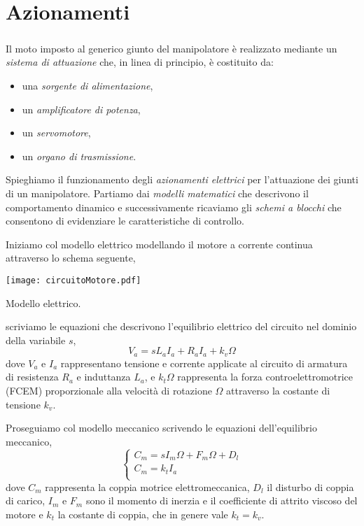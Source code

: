 \chapter{Azionamenti}
\paragraph{}
Il moto imposto al generico giunto del manipolatore è realizzato mediante un \emph{sistema di attuazione} che, in linea di principio, è costituito da:
\begin{itemize}
	\item una \emph{sorgente di alimentazione},
	\item un \emph{amplificatore di potenza},
	\item un \emph{servomotore},
	\item un \emph{organo di trasmissione}. 
\end{itemize}

Spieghiamo il funzionamento degli \emph{azionamenti elettrici} per l'attuazione dei giunti di un manipolatore. Partiamo dai \emph{modelli matematici} che descrivono il comportamento dinamico e successivamente ricaviamo gli \emph{schemi a blocchi} che consentono di evidenziare le caratteristiche di controllo.

Iniziamo col modello elettrico modellando il motore a corrente continua attraverso lo schema seguente,
\begin{center}
	\texttt{[image: circuitoMotore.pdf]}
	\caption{Modello elettrico.}
\end{center}

scriviamo le equazioni che descrivono l'equilibrio elettrico del circuito nel dominio della variabile $s$,
\begin{equation}
	V_a = s L_a I_a + R_a I_a + k_v \Omega
\end{equation}
dove $V_a$ e $I_a$ rappresentano tensione e corrente applicate al circuito di armatura di resistenza $R_a$ e induttanza $L_a$, e $k_t \Omega$ rappresenta la forza controelettromotrice (FCEM) proporzionale alla velocità di rotazione $\Omega$ attraverso la costante di tensione $k_v$.

Proseguiamo col modello meccanico scrivendo le equazioni dell'equilibrio meccanico,
\begin{equation}
	\begin{cases}
		C_m = sI_m \Omega + F_m \Omega + D_l \\
		C_m = k_t I_a \\
	\end{cases}	
\end{equation}
dove $C_m$ rappresenta la coppia motrice elettromeccanica, $D_l$ il disturbo di coppia di carico, $I_m$ e $F_m$ sono il momento di inerzia e il coefficiente di attrito viscoso del motore e $k_t$ la costante di coppia, che in genere vale $k_t = k_v$.

